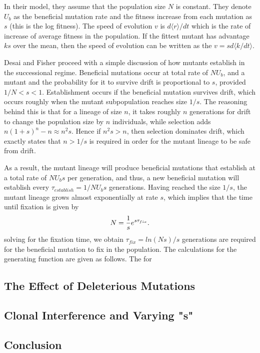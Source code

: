 \documentclass[12pt,twocolumn]{article}
\begin{document}
In their model, they assume that the population size $N$ is constant.  They denote $U_b$ as the beneficial mutation rate and the fitness increase from each   mutation as $s$ (this is the log fitness).  The speed of evolution $v$ is $d\langle r \rangle / dt$ which is the rate of increase of average fitness in the population.  If the fittest mutant has advantage $ks$ over the mean, then the speed of evolution can be written as the $v=sd\langle k  / dt \rangle$.  

Desai and Fisher proceed with a simple discussion of how mutants establish in the successional regime.  Beneficial mutations occur at total rate of $NU_b$, and a mutant and the probability for it to survive drift is proportional to $s$, provided $1/N<s<1$.  Establishment occurs if the beneficial mutation survives drift, which occurs roughly when the mutant subpopulation reaches size $1/s$.  The reasoning behind this is that for a lineage of size $n$, it takes roughly $n$ generations for drift to change the population size by $n$ individuals, while selection adds $n(1+s)^n-n \approx n^2s$.  Hence if $n^2s>n$, then selection dominates drift, which exactly states that $n>1/s$ is required in order for the mutant lineage to be safe from drift. 

As a result, the mutant lineage will produce beneficial mutations that establish at a total rate of $NU_bs$ per generation, and thus, a new beneficial mutation will establish every $\tau_{establish} = 1/NU_bs$ generations.  Having reached the size $1/s$, the mutant lineage grows almost exponentially at rate $s$, which implies that the time until fixation is given by
\[
N={1 \over s}e^{s \tau_{fix}}.
\]
solving for the fixation time, we obtain $\tau_{fix}=ln(Ns)/s$ generations are required for the beneficial mutation to fix in the population.  
The calculations for the generating function are given as follows. The for

\subsection*{The Effect of Deleterious Mutations}

\subsection*{Clonal Interference and Varying "s"}

\subsection*{Conclusion}
\end{document}
